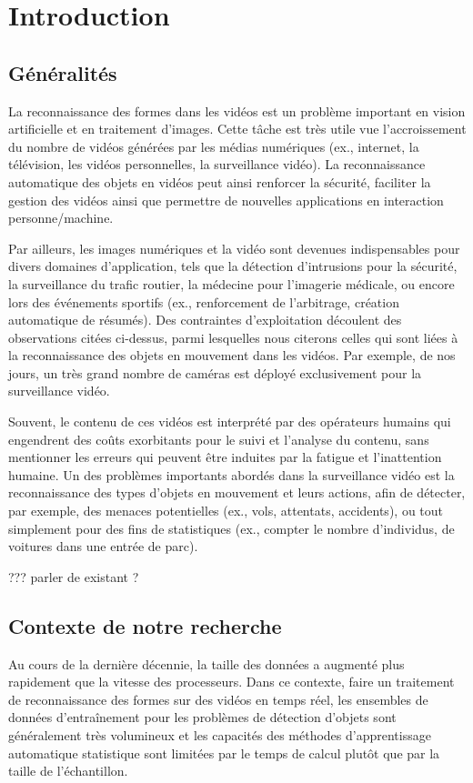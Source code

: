 

\chapter{Introduction}
	\section{Généralités}

		La reconnaissance des formes dans les vidéos est un problème important en vision artificielle et en traitement d'images. Cette tâche est très utile vue l'accroissement du nombre de vidéos générées par les médias numériques (ex., internet, la télévision, les vidéos personnelles, la surveillance vidéo). La reconnaissance automatique des objets en vidéos peut ainsi renforcer la sécurité, faciliter la gestion des vidéos ainsi que permettre de nouvelles applications en interaction personne/machine.
		
		Par ailleurs, les images numériques et la vidéo sont devenues indispensables pour divers domaines d'application, tels que la détection d'intrusions pour la sécurité, la surveillance du trafic routier, la médecine pour l'imagerie médicale, ou encore lors des événements sportifs (ex., renforcement de l'arbitrage, création automatique de résumés).
		Des contraintes d'exploitation découlent des observations citées ci-dessus, parmi lesquelles nous citerons celles qui sont liées à la reconnaissance des objets en mouvement dans les vidéos. Par exemple, de nos jours, un très grand nombre de caméras est déployé exclusivement pour la surveillance vidéo.\cite{ahadjitse2013reconnaissance} 
		
		Souvent, le contenu de ces vidéos est interprété par des opérateurs humains qui engendrent des coûts exorbitants pour le suivi et l'analyse du contenu, sans mentionner les erreurs qui peuvent être induites par la fatigue et l'inattention humaine. 
		Un des problèmes importants abordés dans la surveillance vidéo est la reconnaissance des types d'objets en mouvement et leurs actions, afin de détecter, par exemple, des menaces potentielles (ex., vols, attentats, accidents), ou tout simplement pour des fins de statistiques (ex., compter le nombre d'individus, de voitures dans une entrée de parc).
		
		??? parler de existant ?
		
		

	\section{Contexte de notre recherche}
		Au cours de la dernière décennie, la taille des données a augmenté plus rapidement que la vitesse des processeurs. 
		Dans ce contexte, faire un traitement de reconnaissance des formes sur des vidéos en temps réel, les ensembles de données d'entraînement pour les problèmes de détection d'objets sont généralement très volumineux et les capacités des méthodes d'apprentissage automatique statistique sont limitées par le temps de calcul plutôt que par la taille de l'échantillon.\cite{bottou2010large} 
	
